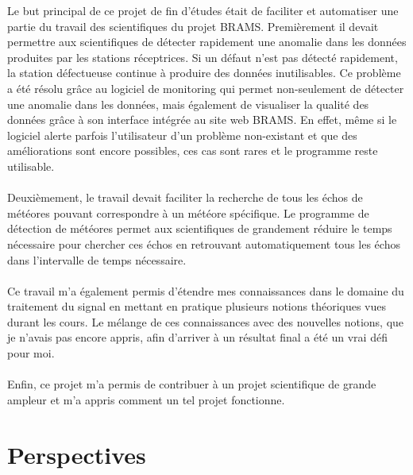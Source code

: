 \documentclass[11pt]{article}
\begin{document}
Le but principal de ce projet de fin d'études était de faciliter et automatiser une partie du travail des scientifiques du projet BRAMS.
Premièrement il devait permettre aux scientifiques de détecter rapidement une anomalie dans les données produites par les stations réceptrices.
Si un défaut n'est pas détecté rapidement, la station défectueuse continue à produire des données inutilisables.
Ce problème a été résolu grâce au logiciel de monitoring qui permet non-seulement de détecter une anomalie dans les données, mais également de visualiser la qualité des données grâce à son interface intégrée au site web BRAMS.
En effet, même si le logiciel alerte parfois l'utilisateur d'un problème non-existant et que des améliorations sont encore possibles, ces cas sont rares et le programme reste utilisable.\\
\\
Deuxièmement, le travail devait faciliter la recherche de tous les échos de météores pouvant correspondre à un météore spécifique.
Le programme de détection de météores permet aux scientifiques de grandement réduire le temps nécessaire pour chercher ces échos en retrouvant automatiquement tous les échos dans l'intervalle de temps nécessaire.\\
\\
Ce travail m'a également permis d'étendre mes connaissances dans le domaine du traitement du signal en mettant en pratique plusieurs notions théoriques vues durant les cours.
Le mélange de ces connaissances avec des nouvelles notions, que je n'avais pas encore appris, afin d'arriver à un résultat final a été un vrai défi pour moi.\\
\\
Enfin, ce projet m'a permis de contribuer à un projet scientifique de grande ampleur et m'a appris comment un tel projet fonctionne.

\newpage

\section{Perspectives}
\end{document}
